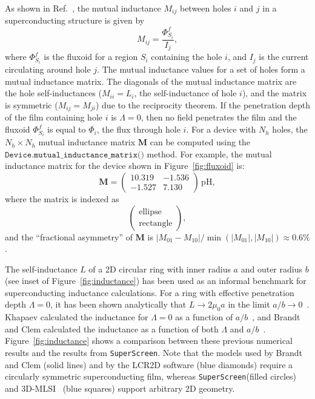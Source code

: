 \documentclass[final,3p,times,twocolumn]{elsarticle}
\newcommand{\inline}[1]{\texttt{#1}\xspace}
\newcommand{\SuperScreen}{\inline{SuperScreen}}
\begin{document}
As shown in Ref.~\cite{Brandt2005-wj}, the mutual inductance $M_{ij}$ between holes $i$ and $j$ in a superconducting structure is given by
\begin{equation}
    M_{ij}=\frac{\Phi^f_{S_i}}{I_j},
\end{equation}
where $\Phi^f_{S_i}$ is the fluxoid for a region $S_i$ containing the hole $i$, and $I_j$ is the current circulating around hole $j$. The mutual inductance values for a set of holes form a mutual inductance matrix. The diagonals of the mutual inductance matrix are the hole self-inductances ($M_{ii}=L_i$, the self-inductance of hole $i$), and the matrix is symmetric ($M_{ij}=M_{ji}$) due to the reciprocity theorem. If the penetration depth of the film containing hole $i$ is $\Lambda = 0$, then no field penetrates the film and the fluxoid $\Phi^f_{S_i}$ is equal to $\Phi_i$, the flux through hole $i$. For a device with $N_h$ holes, the $N_h\times N_h$ mutual inductance matrix $\mathbf{M}$ can be computed using the $\inline{Device.mutual_inductance_matrix()}$ method. For example, the mutual inductance matrix for the device shown in Figure~\ref{fig:fluxoid} is:
\begin{equation*}
    \mathbf{M} = 
    \begin{pmatrix}
    	10.319 & -1.536 \\
        -1.527 & 7.130
    \end{pmatrix}
    \,\mathrm{pH},
\end{equation*}
where the matrix is indexed as $$\begin{pmatrix}\text{ellipse}\\\text{rectangle}\end{pmatrix},$$
and the ``fractional asymmetry'' of $\mathbf{M}$ is $|M_{01} - M_{10}| / \min(|M_{01}|, |M_{10}|)\approx 0.6\%$.

The self-inductance $L$ of a 2D circular ring with inner radius $a$ and outer radius $b$ (see inset of Figure~\ref{fig:inductance}) has been used as an informal benchmark for superconducting inductance calculations. For a ring with effective penetration depth $\Lambda = 0$, it has been shown analytically that $L\to 2\mu_0 a$ in the limit $a/b\to 0$~\cite{Ketchen2012-mb, Babaei_Brojeny2003-la}. Khapaev calculated the inductance for $\Lambda = 0$ as a function of $a/b$~\cite{Khapaev1997-kw}, and Brandt and Clem calculated the inductance as a function of both $\Lambda$ and $a / b$~\cite{Brandt2004-ew}. Figure~\ref{fig:inductance} shows a comparison between these previous numerical results and the results from \SuperScreen. Note that the models used by Brandt and Clem (solid lines) and by the LCR2D software (blue diamonds) require a circularly symmetric superconducting film, whereas \SuperScreen (filled circles) and 3D-MLSI~\cite{Khapaev1997-kw, Khapaev2001-xq, Khapaev2001-pw} (blue squares) support arbitrary 2D geometry. 
\end{document}
